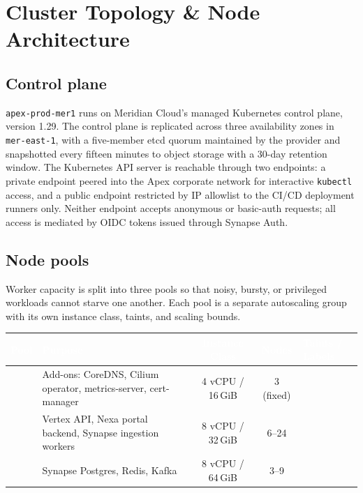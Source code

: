 \section{Cluster Topology \& Node Architecture}

\subsection{Control plane}
\texttt{apex-prod-mer1} runs on Meridian Cloud's managed Kubernetes control plane, version 1.29. The control plane is replicated across three availability zones in \texttt{mer-east-1}, with a five-member etcd quorum maintained by the provider and snapshotted every fifteen minutes to object storage with a 30-day retention window. The Kubernetes API server is reachable through two endpoints: a private endpoint peered into the Apex corporate network for interactive \texttt{kubectl} access, and a public endpoint restricted by IP allowlist to the CI/CD deployment runners only. Neither endpoint accepts anonymous or basic-auth requests; all access is mediated by OIDC tokens issued through Synapse Auth.

\subsection{Node pools}
Worker capacity is split into three pools so that noisy, bursty, or privileged workloads cannot starve one another. Each pool is a separate autoscaling group with its own instance class, taints, and scaling bounds.

\begin{center}
\begin{tabularx}{\linewidth}{@{}l L c c L@{}}
\toprule
{}
\textcolor{white}{\textbf{Pool}} & \textcolor{white}{\textbf{Purpose}} & \textcolor{white}{\textbf{Instance Class}} & \textcolor{white}{\textbf{Nodes}} & \textcolor{white}{\textbf{Taints / Labels}} \\
\midrule
{} & Add-ons: CoreDNS, Cilium operator, metrics-server, cert-manager & 4 vCPU / 16\,GiB & 3 (fixed) &  \\
 & Vertex API, Nexa portal backend, Synapse ingestion workers & 8 vCPU / 32\,GiB & 6--24 &  \\
 & Synapse Postgres, Redis, Kafka & 8 vCPU / 64\,GiB & 3--9 &  \\
\bottomrule
\end{tabularx}
\end{center}

